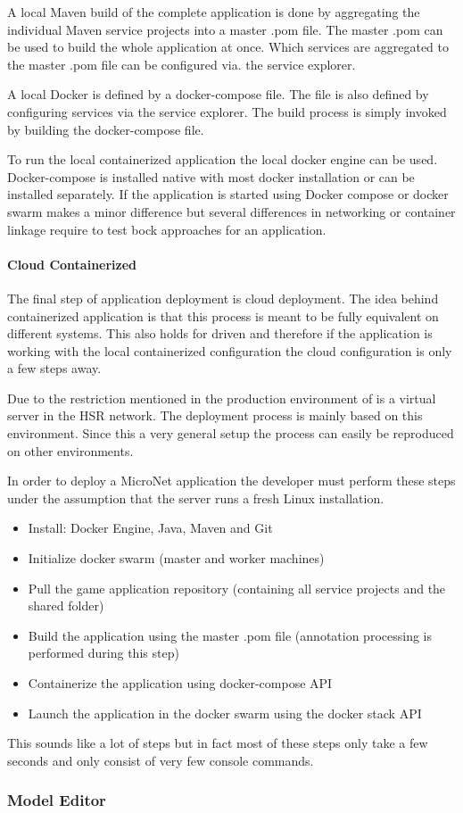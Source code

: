A local Maven build of the complete application is done by aggregating the
individual Maven service projects into a master .pom file. The master .pom can
be used to build the whole application at once. Which services are aggregated to
the master .pom file can be configured via. the service explorer.

A local Docker is defined by a docker-compose file. The file is also defined by
configuring services via the service explorer. The build process is simply
invoked by building the docker-compose file.

To run the local containerized application the local docker engine can be used.
Docker-compose is installed native with most docker installation or can be
installed separately. If the application is started using Docker compose or
docker swarm makes a minor difference but several differences in networking or
container linkage require to test bock approaches for an application.

\paragraph{Cloud Containerized}

The final step of \ms{} application deployment is cloud deployment. The idea
behind containerized application is that this process is meant to be fully
equivalent on different systems. This also holds for \ms{} driven \og{} and
therefore if the application is working with the local containerized
configuration the cloud configuration is only a few steps away.

Due to the restriction mentioned in  the production environment
of \mn{} is a virtual server in the HSR network. The deployment process is
mainly based on this environment. Since this a very general setup the process
can easily be reproduced on other environments.

In order to deploy a MicroNet \ms{} application the developer must perform these
steps under the assumption that the server runs a fresh Linux installation.

\begin{itemize}
  \item Install: Docker Engine, Java, Maven and Git
  \item Initialize docker swarm (master and worker machines)
  \item Pull the game application repository (containing all service projects
  and the shared folder)
  \item Build the application using the master .pom file (annotation processing
  is performed during this step)
  \item Containerize the application using docker-compose API
  \item Launch the application in the docker swarm using the docker stack API 
\end{itemize}

This sounds like a lot of steps but in fact most of these steps only take a few
seconds and only consist of very few console commands.

\subsubsection{Model Editor}
